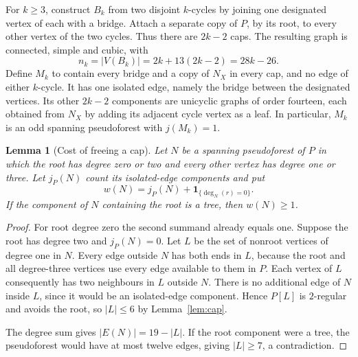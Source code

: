 \documentclass[11pt]{article}
\newtheorem{lemma}[theorem]{Lemma}
\begin{document}
For $k\geq3$, construct $B_k$ from two disjoint $k$-cycles by
joining one designated vertex of each with a bridge. Attach a
separate copy of $P$, by its root, to every other vertex of the
two cycles. Thus there are $2k-2$ caps. The resulting graph is
connected, simple and cubic, with
\[
 n_k=|V(B_k)|=2k+13(2k-2)=28k-26.
\]
Define $M_k$ to contain every bridge and a copy of $N_X$ in every
cap, and no edge of either $k$-cycle. It has one isolated edge,
namely the bridge between the designated vertices. Its other
$2k-2$ components are unicyclic graphs of order fourteen, each
obtained from $N_X$ by adding its adjacent cycle vertex as a leaf.
In particular, $M_k$ is an odd spanning pseudoforest with $j(M_k)=1$.

\begin{lemma}[Cost of freeing a cap]\label{lem:free-cap}
Let $N$ be a spanning pseudoforest of $P$ in which the root has
degree zero or two and every other vertex has degree one or three.
Let $j_P(N)$ count its isolated-edge components and put
\[
 w(N)=j_P(N)+\mathbf1_{\{\deg_N(r)=0\}}.
\]
If the component of $N$ containing the root is a tree, then
$w(N)\geq1$.
\end{lemma}
\begin{proof}
For root degree zero the second summand already equals one.
Suppose the root has degree two and $j_P(N)=0$. Let $L$ be the
set of nonroot vertices of degree one in $N$. Every edge outside
$N$ has both ends in $L$, because the root and all degree-three
vertices use every edge available to them in $P$. Each vertex
of $L$ consequently has two neighbours in $L$ outside $N$.
There is no additional edge of $N$ inside $L$, since it would be
an isolated-edge component. Hence $P[L]$ is $2$-regular and
avoids the root, so $|L|\leq6$ by Lemma~\ref{lem:cap}.

The degree sum gives $|E(N)|=19-|L|$. If the root component
were a tree, the pseudoforest would have at most twelve edges,
giving $|L|\geq7$, a contradiction.
\end{proof}
\end{document}
